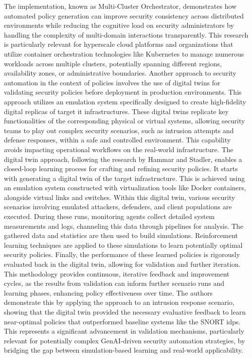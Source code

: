 The implementation, known as Multi-Cluster Orchestrator, demonstrates how automated policy generation can improve security consistency across distributed environments while reducing the cognitive load on security administrators by handling the complexity of multi-domain interactions transparently\cite{bringhenti_security_2023}. This research is particularly relevant for \gls{hyperscale} cloud platforms and organizations that utilize container orchestration technologies like Kubernetes to manage numerous workloads across multiple clusters, potentially spanning different regions, availability zones, or administrative boundaries\cite{bringhenti_security_2023}.
Another approach to security automation in the context of policies involves the use of digital twins for validating security policies before deployment in production environments\cite{hammar_digital_2023}. This approach utilizes an emulation system specifically designed to create high-fidelity digital replicas of target \gls{it} infrastructures\cite{hammar_digital_2023}. These digital twins replicate key functionalities of the corresponding physical or virtual systems, allowing security teams to play out complex security scenarios, such as intrusion attempts and defense responses, within a safe and controlled environment\cite{hammar_digital_2023}. This capability avoids impacting operational workflows on the real-world infrastructure\cite{hammar_digital_2023}.
The digital twin approach, following the research by Hammar and Stadler, enables a closed-loop learning process for crafting and refining security policies\cite{hammar_digital_2023}. It starts with generating a digital twin of the target infrastructure. This is achieved using an emulation system constructed with virtualization tools like Docker containers, alongside virtual links and switches\cite{hammar_digital_2023}. Within this digital twin, various security scenarios involving emulated attackers, defenders, and client populations are executed\cite{hammar_digital_2023}. During these runs, monitoring agents collect detailed system measurements and logs, channeling this data through pipelines for analysis\cite{hammar_digital_2023}. The gathered data and statistics are then used to build simulations\cite{hammar_digital_2023}. Reinforcement learning techniques are applied to these simulations to learn potentially optimal security policies\cite{hammar_digital_2023}. Finally, the performance of these learned policies is rigorously evaluated back in the digital twin, allowing for validation and further iteration\cite{hammar_digital_2023}. This methodology provides continuous, iterative feedback and improvement cycles, as the results from validation can inform further scenario runs and learning phases, enhancing policy effectiveness over time\cite{hammar_digital_2023}. The authors demonstrate this by applying the approach to an intrusion response scenario, showing that the digital twin provided the necessary evaluative feedback to learn near-optimal policies that outperformed baseline systems like the SNORT \gls{idps}\cite{zhou_study_2010}. This represents a significant advancement in validation mechanisms, particularly relevant for potentially complex GenAI-driven security automation strategies, by bridging the gap between simulation-based learning and real-world applicability\cite{hammar_digital_2023}.
